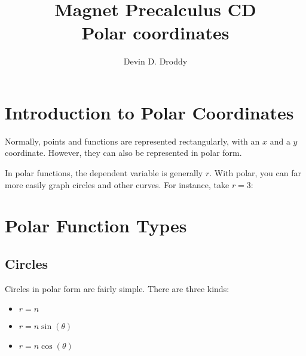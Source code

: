 \documentclass{report}
\title{\Huge{Magnet Precalculus CD}\\Polar coordinates}
\author{\huge{Devin D. Droddy}}
\date{}
\begin{document}
    \maketitle
    \newpage%
    \tableofcontents
    \pagebreak

    \chapter{Introduction to Polar Coordinates}

    Normally, points and functions are represented rectangularly, with an $x$ and a $y$ coordinate. However, they can also be represented in polar form.

    In polar functions, the dependent variable is generally $r$. With polar, you can far more easily graph circles and other curves. For instance, take $r=3$:
    \begin{center}
    \end{center}

    \chapter{Polar Function Types}
    \section{Circles}

    Circles in polar form are fairly simple. There are three kinds:
    \begin{itemize}
        \item $r=n$
        \item $r=n\sin(\theta)$
        \item $r=n\cos(\theta)$
    \end{itemize}
\end{document}
